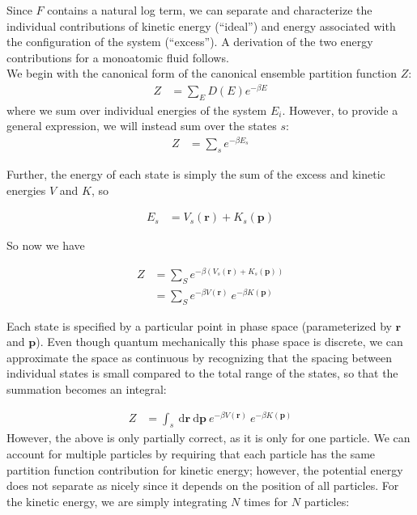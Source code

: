 \documentclass[12pt]{article}
\newcommand{\ignore}[1]{}
\newcommand*{\diff}{\mathrm{d}}
\begin{document}
Since $F$ contains a natural log term, we can separate and characterize the individual contributions of kinetic energy (``ideal'') and energy associated with the configuration of the system (``excess'').  
A derivation of the two energy contributions for a monoatomic fluid follows. \\

\ignore{{\color{red} [This should probably go in an appendix. Further: replace $Z_C$ with $Z_{exc}$; fix the to the N on the $Z_{exc}$ term; include the $N!$ into the ideal term; fix the $V(r_1, r_2, ...)$||| All done! NOW: fix the dimensions on the $Z_{id}$ term!]}}

We begin with the canonical form of the canonical ensemble partition function $Z$:
\begin{align}
    Z &= \sum_E D(E) e^{-\beta E}
\end{align}
where we sum over individual energies of the system $E_i$. However, to provide a general expression, we will instead sum over the states $s$:
\begin{align}
    Z &= \sum_s e^{-\beta E_s}
\end{align} 

Further, the energy of each state is simply the sum of the excess and kinetic energies $V$ and $K$, so

\begin{align}
    E_s &= V_s(\mathbf{r}) + K_s(\mathbf{p})
\end{align}

So now we have 

\begin{align}
    Z &= \sum_S e^{-\beta (V_s(\mathbf{r}) + K_s(\mathbf{p}))}\\
    &= \sum_S e^{-\beta V(\mathbf{r})}~e^{-\beta K(\mathbf{p})}
\end{align} 

Each state is specified by a particular point in phase space (parameterized by $\mathbf{r}$ and $\mathbf{p}$). Even though quantum mechanically this phase space is discrete, we can approximate the space as continuous by recognizing that the spacing between individual states is small compared to the total range of the states, so that the summation becomes an integral:

\begin{align}
    Z &= \int_s~ \diff\mathbf{r}~ \diff\mathbf{p} ~e^{-\beta V(\mathbf{r})}~e^{-\beta K(\mathbf{p})}
\end{align} 
However, the above is only partially correct, as it is only for one particle. We can account for multiple particles by requiring that each particle has the same partition function contribution for kinetic energy; however, the potential energy does not separate as nicely since it depends on the position of all particles. For the kinetic energy, we are simply integrating $N$ times for $N$ particles:
\end{document}
